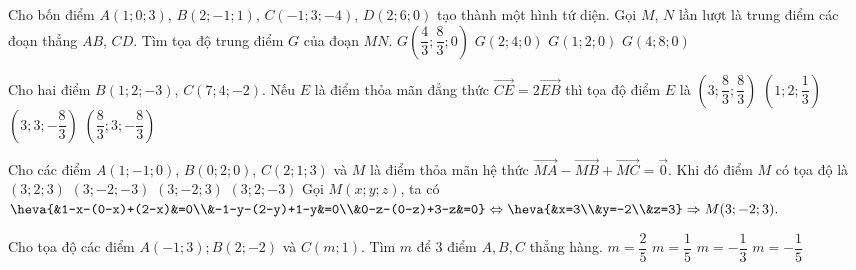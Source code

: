 \begin{ex}
	Cho bốn điểm $A(1;0;3)$, $B(2;-1;1)$, $C(-1;3;-4)$, $D(2;6;0)$ tạo thành một hình tứ diện. Gọi $M$, $N$ lần lượt là trung điểm các đoạn thẳng $AB$, $CD$. Tìm tọa độ trung điểm $G$ của đoạn $MN$.
	\choice
	{$G\left(\dfrac{4}{3};\dfrac{8}{3};0\right)$}
	{$G(2;4;0)$}
	{\True $G(1;2;0)$}
	{$G(4;8;0)$}
\end{ex} 


\begin{ex}
	Cho hai điểm $B(1;2;-3)$, $C(7;4;-2)$. Nếu $E$ là điểm thỏa mãn đẳng thức $\vec{CE}=2\vec{EB}$ thì tọa độ điểm $E$ là
	\choice
	{$\left(3;\dfrac{8}{3};\dfrac{8}{3}\right)$}
	{$\left(1;2;\dfrac{1}{3}\right)$}
	{$\left(3;3;-\dfrac{8}{3}\right)$}
	{\True $\left(\dfrac{8}{3};3;-\dfrac{8}{3}\right)$}
\end{ex} 

\begin{ex}
	Cho các điểm $A(1;-1;0)$, $B(0;2;0)$, $C(2;1;3)$ và $M$ là điểm thỏa mãn hệ thức $\vec{MA}-\vec{MB}+\vec{MC}=\vec{0}$. Khi đó điểm $M$ có tọa độ là
	\choice
	{$(3;2;3)$}
	{$(3;-2;-3)$}
	{\True$(3;-2;3)$}
	{$(3;2;-3)$}
	\loigiai
	{
		Gọi $M(x;y;z)$, ta có $\heva{&1-x-(0-x)+(2-x)&=0\\&-1-y-(2-y)+1-y&=0\\&0-z-(0-z)+3-z&=0}\Leftrightarrow \heva{&x=3\\&y=-2\\&z=3}\Rightarrow M(3;-2;3).$
	}
\end{ex} 

\begin{ex}
	Cho tọa độ các điểm $A(-1;3);B(2;-2)$ và $C(m;1)$. Tìm $m$ để $3$ điểm $A,B,C$ thẳng hàng.
	\choice
	{$m=\dfrac{2}{5}$}
	{$m=\dfrac{1}{5}$}
	{$m=-\dfrac{1}{3}$}
	{\True $m=-\dfrac{1}{5}$}
\end{ex} 

